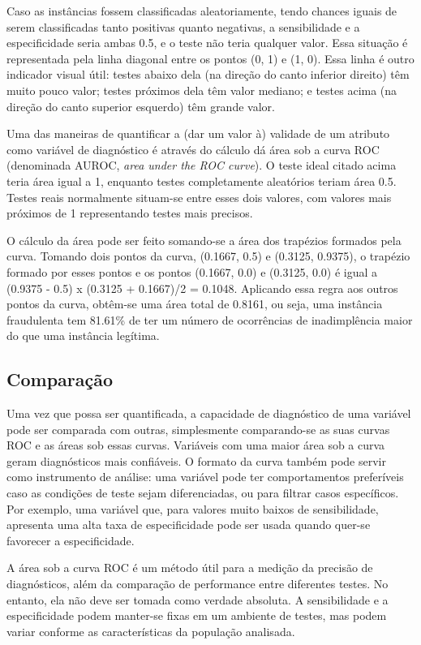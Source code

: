 Caso as instâncias fossem classificadas aleatoriamente, tendo chances iguais de serem classificadas tanto positivas quanto negativas, a sensibilidade e a especificidade seria ambas 0.5, e o teste não teria qualquer valor. Essa situação é representada pela linha diagonal entre os pontos (0, 1) e (1, 0). Essa linha é outro indicador visual útil: testes abaixo dela (na direção do canto inferior direito) têm muito pouco valor; testes próximos dela têm valor mediano; e testes acima (na direção do canto superior esquerdo) têm grande valor.

Uma das maneiras de quantificar a (dar um valor à) validade de um atributo como variável de diagnóstico é através do cálculo dá área sob a curva ROC (denominada AUROC, \emph{area under the ROC curve}). O teste ideal citado acima teria área igual a 1, enquanto testes completamente aleatórios teriam área 0.5. Testes reais normalmente situam-se entre esses dois valores, com valores mais próximos de 1 representando testes mais precisos.

O cálculo da área pode ser feito somando-se a área dos trapézios formados pela curva. Tomando dois pontos da curva, (0.1667, 0.5) e (0.3125, 0.9375), o trapézio formado por esses pontos e os pontos (0.1667, 0.0) e (0.3125, 0.0) é igual a (0.9375 - 0.5) x (0.3125 + 0.1667)/2 = 0.1048. Aplicando essa regra aos outros pontos da curva, obtêm-se uma área total de 0.8161, ou seja, uma instância fraudulenta tem 81.61\% de ter um número de ocorrências de inadimplência maior do que uma instância legítima.

\subsection{Comparação}

Uma vez que possa ser quantificada, a capacidade de diagnóstico de uma variável pode ser comparada com outras, simplesmente comparando-se as suas curvas ROC e as áreas sob essas curvas. Variáveis com uma maior área sob a curva geram diagnósticos mais confiáveis. O formato da curva também pode servir como instrumento de análise: uma variável pode ter comportamentos preferíveis caso as condições de teste sejam diferenciadas, ou para filtrar casos específicos. Por exemplo, uma variável que, para valores muito baixos de sensibilidade, apresenta uma alta taxa de especificidade pode ser usada quando quer-se favorecer a especificidade.

A área sob a curva ROC é um método útil para a medição da precisão de diagnósticos, além da comparação de performance entre diferentes testes. No entanto, ela não deve ser tomada como verdade absoluta. A sensibilidade e a especificidade podem manter-se fixas em um ambiente de testes, mas podem variar conforme as características da população analisada.

